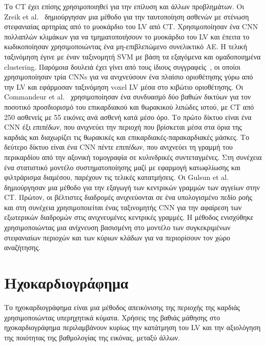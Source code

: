 Το CT έχει επίσης χρησιμοποιηθεί για την επίλυση και άλλων προβλημάτων.
Οι Zreik et al.~\cite{zreik2018deep} δημιούργησαν μια μέθοδο για την ταυτοποίηση ασθενών με στένωση στεφανιαίας αρτηρίας από το μυοκάρδιο του LV από CT\@.
Χρησιμοποίησαν ένα CNN πολλαπλών κλιμάκων για να τμηματοποιήσουν το μυοκάρδιο του LV και έπειτα το κωδικοποίησαν χρησιμοποιώντας ένα μη-επιβλεπώμενο συνελικτικό ΑΕ.
Η τελική ταξινόμηση έγινε με έναν ταξινομητή SVM με βάση τα εξαγόμενα και ομαδοποιημένα clustering.
Παρόμοια δουλειά έχει γίνει από τους ίδιους συγγραφείς~\cite{zreik2016automatic}, οι οποίοι χρησιμοποίησαν τρία CNNs για να ανιχνεύσουν ένα πλαίσιο οριοθέτησης γύρω από την LV και εφάρμοσαν ταξινόμηση voxel LV μέσα στο κιβώτιο οριοθέτησης.
Οι Commandeur et al.~\cite{commandeur2018deep} χρησιμοποίησαν ένα συνδυασμό δύο βαθιών δικτύων για τον ποσοτικό προσδιορισμό του επικαρδιακού και θωρακικού λιπώδες ιστού, με CT από 250 ασθενείς με 55 εικόνες ανά ασθενή κατά μέσο όρο.
Το πρώτο δίκτυο είναι ένα CNN έξι \textit{επιπέδων}, που ανιχνεύει την περιοχή που βρίσκεται μέσα στα όρια της καρδιάς και διαχωρίζει τις θωρακικές και επικαρδιακές-παρακαρδιακές μάσκες.
Το δεύτερο δίκτυο είναι ένα CNN πέντε \textit{επιπέδων}, που ανιχνεύει τη γραμμή του περικαρδίου από την αξονική τομογραφία σε κυλινδρικές συντεταγμένες.
Στη συνέχεια ένα στατιστικό μοντέλο συστηματοποίησης μαζί με εφαρμογή κατωφλίωσης και φιλτράρισμα διαμέσου, παρέχουν τις τελικές κατατμήσεις.
Οι Gulsun et al.~\cite{gulsun2016coronary} δημιούργησαν μια μέθοδο για την εξαγωγή των κεντρικών γραμμών των αγγείων στην CT\@.
Πρώτον, οι βέλτιστες διαδρομές ανιχνεύονται σε ένα υπολογισμένο πεδίο ροής και στη συνέχεια χρησιμοποιείται ένας ταξινομητής CNN για την αφαίρεση των εξωτερικών διαδρομών στις ανιχνευμένες κεντρικές γραμμές.
Η μέθοδος ενισχύθηκε χρησιμοποιώντας μια ανίχνευση βασισμένη στο μοντέλο των συγκεκριμένων στεφανιαίων περιοχών και των κύριων κλάδων για να περιορίσουν τον χώρο αναζήτησης.

\section{Ηχοκαρδιογράφημα}
Το ηχοκαρδιογράφημα είναι μια μέθοδος απεικόνισης της περιοχής της καρδιάς χρησιμοποιώντας υπερηχητικά κύματα.
Χρήσεις της βαθιάς μάθησης στο ηχοκαρδιογράφημα περιλαμβάνουν κυρίως την κατάτμηση του LV και την αξιολόγηση της ποιότητας της βαθμολογίας της εικόνας, μεταξύ άλλων.

